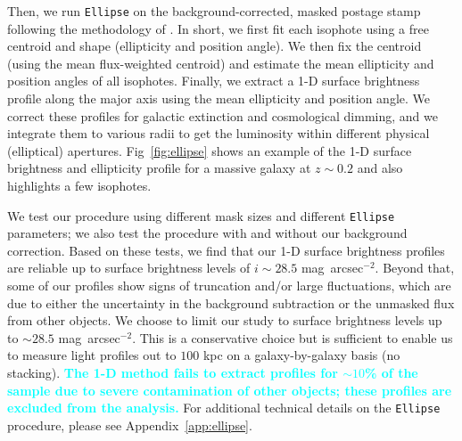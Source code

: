\documentclass[fleqn,usenatbib]{mnras}
\def\sb{mag~arcsec$^{-2}$}
\newcommand{\song}[1]{\textcolor{cyan}{\textbf{#1}}}
\begin{document}
    Then, we run \texttt{Ellipse} on the background-corrected, masked postage stamp 
    following the methodology of \citet{Li2012}. 
    In short, we first fit each isophote using a free centroid and shape 
    (ellipticity and position angle). 
    We then fix the centroid (using the mean flux-weighted centroid) and estimate
    the mean ellipticity and position angles of all isophotes. 
    Finally, we extract a 1-D surface brightness profile along the major axis using 
    the mean ellipticity and position angle. 
    We correct these profiles for galactic extinction and cosmological dimming, 
    and we integrate them to various radii to get the luminosity 
    within different physical (elliptical) apertures. 
    Fig~\ref{fig:ellipse} shows an example of the 1-D surface brightness and 
    ellipticity profile for a massive galaxy at $z{\sim}0.2$ and also highlights 
    a few isophotes.    

    We test our procedure using different mask sizes and different \texttt{Ellipse} 
    parameters; we also test the procedure with and without our background correction. 
    Based on these tests, we find that our 1-D surface brightness profiles are 
    reliable up to surface brightness levels of $i{\sim}28.5$ \sb. 
    Beyond that, some of our profiles show signs of truncation and/or large 
    fluctuations, which are due to either the uncertainty in the background 
    subtraction or the unmasked flux from other objects.
    We choose to limit our study to surface brightness levels up to ${\sim} 28.5$ \sb. 
    This is a conservative choice but is sufficient to enable us to measure light 
    profiles out to $100$ kpc on a galaxy-by-galaxy basis (no stacking). 
    \song{
    The 1-D method fails to extract profiles for ${\sim}10$\% of the sample due 
    to severe contamination of other objects; these profiles are excluded from the
    analysis.
    }
    For additional technical details on the \texttt{Ellipse} procedure, please see 
    Appendix~\ref{app:ellipse}.
    
\end{document}
